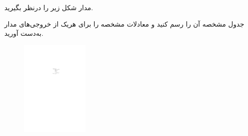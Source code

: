

مدار شکل زیر را درنظر بگیرید.

جدول مشخصه آن را رسم کنید و معادلات مشخصه را برای هریک از خروجی‌های مدار به‌دست آورید.


\begin{figure}[h]
	\centering
	\includegraphics[width=0.3\textwidth]{fig/Q_basic1.pdf}
	\label{fig:Q_basic_1}
\end{figure}